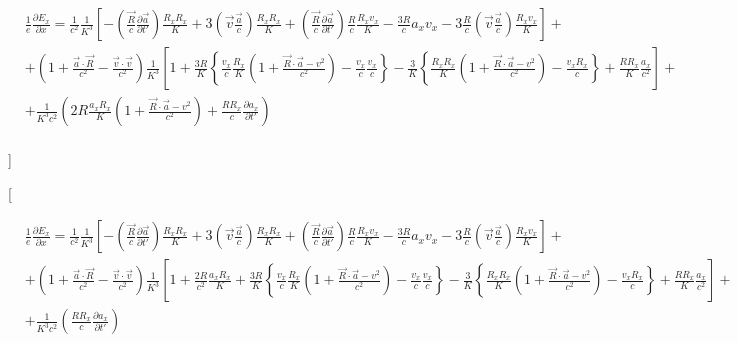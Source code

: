 \documentclass[11pt]{article}
\begin{document}
\begin{align}
  & \frac{1}{e}\frac{\partial {{E}_{x}}}{\partial x}=\frac{1}{{{c}^{2}}}\frac{1}{{{K}^{3}}}\left[ -\left( \frac{\overrightarrow{R}}{c}\frac{\partial \overrightarrow{a}}{\partial t'} \right)\frac{{{R}_{x}}{{R}_{x}}}{K}+3\left( \overrightarrow{v}\frac{\overrightarrow{a}}{c} \right)\frac{{{R}_{x}}{{R}_{x}}}{K}+\left( \frac{\overrightarrow{R}}{c}\frac{\partial \overrightarrow{a}}{\partial t'} \right)\frac{R}{c}\frac{{{R}_{x}}{{v}_{x}}}{K}-\frac{3R}{c}{{a}_{x}}{{v}_{x}}-3\frac{R}{c}\left( \overrightarrow{v}\frac{\overrightarrow{a}}{c} \right)\frac{{{R}_{x}}{{v}_{x}}}{K} \right]+ \\ 
 & +\left( 1+\frac{\overrightarrow{a}\cdot \overrightarrow{R}}{{{c}^{2}}}-\frac{\overrightarrow{v}\cdot \overrightarrow{v}}{{{c}^{2}}} \right)\frac{1}{{{K}^{3}}}\left[ 1+\frac{3R}{K}\left\{ \frac{{{v}_{x}}}{c}\frac{{{R}_{x}}}{K}\left( 1+\frac{\overrightarrow{R}\cdot \overrightarrow{a}-{{v}^{2}}}{{{c}^{2}}} \right)-\frac{{{v}_{x}}}{c}\frac{{{v}_{x}}}{c} \right\}-\frac{3}{K}\left\{ \frac{{{R}_{x}}{{R}_{x}}}{K}\left( 1+\frac{\overrightarrow{R}\cdot \overrightarrow{a}-{{v}^{2}}}{{{c}^{2}}} \right)-\frac{{{v}_{x}}{{R}_{x}}}{c} \right\}+\frac{R{{R}_{x}}}{K}\frac{{{a}_{x}}}{{{c}^{2}}} \right]+ \\ 
 & +\frac{1}{{{K}^{3}}{{c}^{2}}}\left( 2R\frac{{{a}_{x}}{{R}_{x}}}{K}\left( 1+\frac{\overrightarrow{R}\cdot \overrightarrow{a}-{{v}^{2}}}{{{c}^{2}}} \right)+\frac{R{{R}_{x}}}{c}\frac{\partial {{a}_{x}}}{\partial t'} \right) \\ 
\end{align}

{]}

{[}

\begin{align}
  & \frac{1}{e}\frac{\partial {{E}_{x}}}{\partial x}=\frac{1}{{{c}^{2}}}\frac{1}{{{K}^{3}}}\left[ -\left( \frac{\overrightarrow{R}}{c}\frac{\partial \overrightarrow{a}}{\partial t'} \right)\frac{{{R}_{x}}{{R}_{x}}}{K}+3\left( \overrightarrow{v}\frac{\overrightarrow{a}}{c} \right)\frac{{{R}_{x}}{{R}_{x}}}{K}+\left( \frac{\overrightarrow{R}}{c}\frac{\partial \overrightarrow{a}}{\partial t'} \right)\frac{R}{c}\frac{{{R}_{x}}{{v}_{x}}}{K}-\frac{3R}{c}{{a}_{x}}{{v}_{x}}-3\frac{R}{c}\left( \overrightarrow{v}\frac{\overrightarrow{a}}{c} \right)\frac{{{R}_{x}}{{v}_{x}}}{K} \right]+ \\ 
 & +\left( 1+\frac{\overrightarrow{a}\cdot \overrightarrow{R}}{{{c}^{2}}}-\frac{\overrightarrow{v}\cdot \overrightarrow{v}}{{{c}^{2}}} \right)\frac{1}{{{K}^{3}}}\left[ 1+\frac{2R}{{{c}^{2}}}\frac{{{a}_{x}}{{R}_{x}}}{K}+\frac{3R}{K}\left\{ \frac{{{v}_{x}}}{c}\frac{{{R}_{x}}}{K}\left( 1+\frac{\overrightarrow{R}\cdot \overrightarrow{a}-{{v}^{2}}}{{{c}^{2}}} \right)-\frac{{{v}_{x}}}{c}\frac{{{v}_{x}}}{c} \right\}-\frac{3}{K}\left\{ \frac{{{R}_{x}}{{R}_{x}}}{K}\left( 1+\frac{\overrightarrow{R}\cdot \overrightarrow{a}-{{v}^{2}}}{{{c}^{2}}} \right)-\frac{{{v}_{x}}{{R}_{x}}}{c} \right\}+\frac{R{{R}_{x}}}{K}\frac{{{a}_{x}}}{{{c}^{2}}} \right]+ \\ 
 & +\frac{1}{{{K}^{3}}{{c}^{2}}}\left( \frac{R{{R}_{x}}}{c}\frac{\partial {{a}_{x}}}{\partial t'} \right) \\ 
\end{align}
\end{document}
